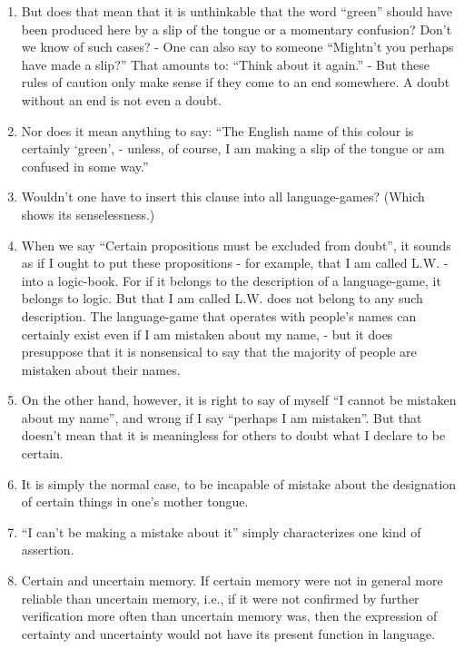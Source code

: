\documentclass{book}
\begin{document}
\begin{enumerate}
\item
But does that mean that it is unthinkable that the word ``green'' should have
been produced here by a slip of the tongue or a momentary confusion? Don't we
know of such cases? - One can also say to someone ``Mightn't you perhaps have
made a slip?'' That amounts to: ``Think about it again.'' - But these rules of
caution only make sense if they come to an end somewhere.  A doubt without an
end is not even a doubt.

\item
Nor does it mean anything to say: ``The English name of this colour is
certainly `green', - unless, of course, I am making a slip of the tongue or am
confused in some way.''

\item
Wouldn't one have to insert this clause into all language-games? (Which shows
its senselessness.)

\item
When we say ``Certain propositions must be excluded from doubt'', it sounds as
if I ought to put these propositions - for example, that I am called L.W. -
into a logic-book. For if it belongs to the description of a language-game, it
belongs to logic. But that I am called L.W. does not belong to any such
description. The language-game that operates with people's names can certainly
exist even if I am mistaken about my name, - but it does presuppose that it is
nonsensical to say that the majority of people are mistaken about their names.

\item
On the other hand, however, it is right to say of myself ``I cannot be mistaken
about my name'', and wrong if I say ``perhaps I am mistaken''. But that doesn't
mean that it is meaningless for others to doubt what I declare to be certain.

\item
It is simply the normal case, to be incapable of mistake about the designation
of certain things in one's mother tongue.

\item
``I can't be making a mistake about it'' simply characterizes one kind of
assertion.

\item
Certain and uncertain memory. If certain memory were not in general more
reliable than uncertain memory, i.e., if it were not confirmed by further
verification more often than uncertain memory was, then the expression of
certainty and uncertainty would not have its present function in language.


\end{enumerate}
\end{document}
